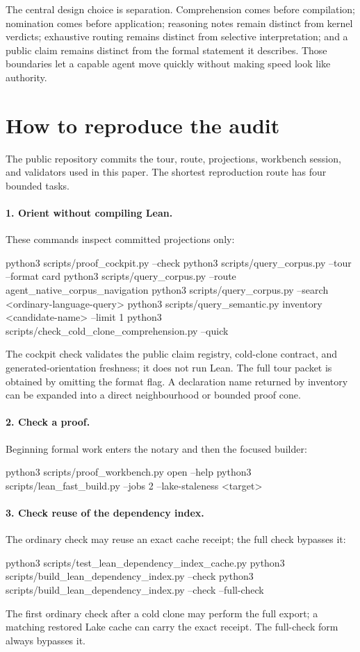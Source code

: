 \documentclass[11pt]{article}
\begin{document}
The central design choice is separation. Comprehension comes before
compilation; nomination comes before application; reasoning notes remain
distinct from kernel verdicts; exhaustive routing remains distinct from
selective interpretation; and a public claim remains distinct from the formal
statement it describes. Those boundaries let a capable agent move quickly
without making speed look like authority.

\appendix
\section{How to reproduce the audit}\label{app:repro}

The public repository commits the tour, route, projections, workbench session,
and validators used in this paper. The shortest reproduction route has four
bounded tasks.

\paragraph{1. Orient without compiling Lean.}
These commands inspect committed projections only:
\begin{routeblock}
python3 scripts/proof_cockpit.py --check
python3 scripts/query_corpus.py --tour --format card
python3 scripts/query_corpus.py --route agent_native_corpus_navigation
python3 scripts/query_corpus.py --search <ordinary-language-query>
python3 scripts/query_semantic.py inventory <candidate-name> --limit 1
python3 scripts/check_cold_clone_comprehension.py --quick
\end{routeblock}
The cockpit check validates the public claim registry, cold-clone contract, and
generated-orientation freshness; it does not run Lean.  The full tour packet is
obtained by omitting the format flag. A declaration name returned by inventory
can be expanded into a direct neighbourhood or bounded proof cone.

\paragraph{2. Check a proof.}
Beginning formal work enters the notary and then the focused builder:
\begin{routeblock}
python3 scripts/proof_workbench.py open --help
python3 scripts/lean_fast_build.py --jobs 2 --lake-staleness <target>
\end{routeblock}

\paragraph{3. Check reuse of the dependency index.}
The ordinary check may reuse an exact cache receipt; the full check bypasses it:
\begin{routeblock}
python3 scripts/test_lean_dependency_index_cache.py
python3 scripts/build_lean_dependency_index.py --check
python3 scripts/build_lean_dependency_index.py --check --full-check
\end{routeblock}
The first ordinary check after a cold clone may perform the full export; a
matching restored Lake cache can carry the exact receipt. The full-check form
always bypasses it.
\end{document}
